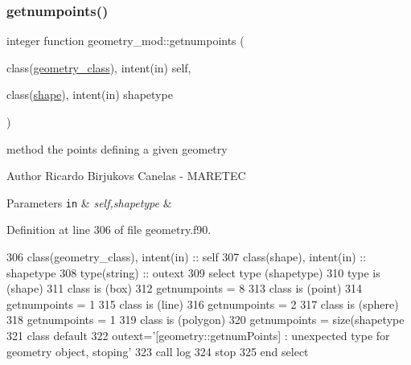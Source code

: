 \subsubsection{\texorpdfstring{getnumpoints()}{getnumpoints()}}
{\footnotesize\ttfamily integer function geometry\+\_\+mod\+::getnumpoints (\begin{DoxyParamCaption}\item[{class(\mbox{\hyperlink{structgeometry__mod_1_1geometry__class}{geometry\+\_\+class}}), intent(in)}]{self,  }\item[{class(\mbox{\hyperlink{structgeometry__mod_1_1shape}{shape}}), intent(in)}]{shapetype }\end{DoxyParamCaption})\hspace{0.3cm}{\ttfamily [private]}}



method the points defining a given geometry 

\begin{DoxyAuthor}{Author}
Ricardo Birjukovs Canelas -\/ M\+A\+R\+E\+T\+EC 
\end{DoxyAuthor}

\begin{DoxyParams}[1]{Parameters}
\mbox{\tt in}  & {\em self,shapetype} & \\
\hline
\end{DoxyParams}


Definition at line 306 of file geometry.\+f90.


\begin{DoxyCode}
306     \textcolor{keywordtype}{class}(geometry\_class), \textcolor{keywordtype}{intent(in)} :: self
307     \textcolor{keywordtype}{class}(shape), \textcolor{keywordtype}{intent(in)} :: shapetype
308     \textcolor{keywordtype}{type}(string) :: outext
309     \textcolor{keywordflow}{select type} (shapetype)
310 \textcolor{keywordflow}{    type is} (shape)
311 \textcolor{keywordflow}{    class is} (box)
312         getnumpoints = 8
313 \textcolor{keywordflow}{    class is} (point)
314         getnumpoints = 1
315 \textcolor{keywordflow}{    class is} (line)
316         getnumpoints = 2
317 \textcolor{keywordflow}{    class is} (sphere)
318         getnumpoints = 1
319 \textcolor{keywordflow}{    class is} (polygon)
320         getnumpoints  = \textcolor{keyword}{size}(shapetype%
321 \textcolor{keywordflow}{        class default}
322         outext=\textcolor{stringliteral}{'[geometry::getnumPoints] : unexpected type for geometry object, stoping'}
323         \textcolor{keyword}{call }log%
324         stop
325 \textcolor{keywordflow}{    end select}
\end{DoxyCode}
\mbox{\label{namespacegeometry__mod_a0b1a3c5aa414292ace34d59487082e3a}} 
